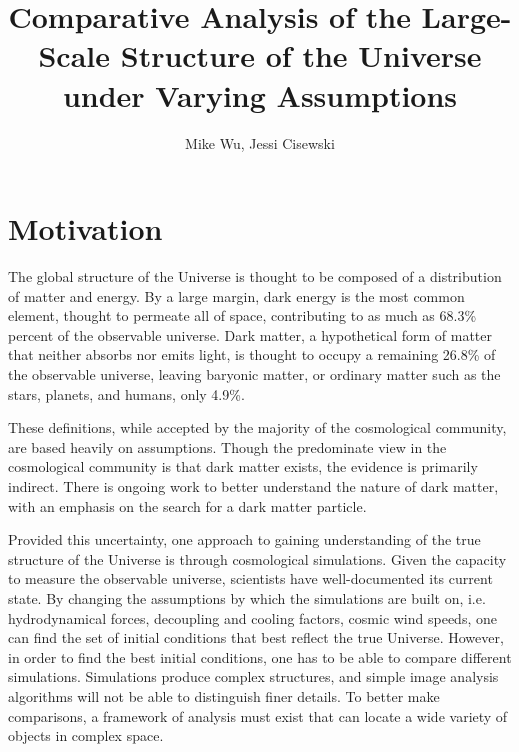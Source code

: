 \documentclass[12pt]{article}
\begin{document}
\title{Comparative Analysis of the Large-Scale Structure of the Universe under Varying Assumptions}
\author{Mike Wu, Jessi Cisewski}

\maketitle
\section{Motivation}
The global structure of the Universe is thought to be composed of a distribution of matter and energy. By a large margin, dark energy is the most common element, thought to permeate all of space, contributing to as much as 68.3\% percent of the observable universe. Dark matter, a hypothetical form of matter that neither absorbs nor emits light, is thought to occupy a remaining 26.8\% of the observable universe, leaving baryonic matter, or ordinary matter such as the stars, planets, and humans, only 4.9\%. 

These definitions, while accepted by the majority of the cosmological community, are based heavily on assumptions. Though the predominate view in the cosmological community is that dark matter exists, the evidence is primarily indirect.  There is ongoing work to better understand the nature of dark matter, with an emphasis on the search for a dark matter particle.

Provided this uncertainty, one approach to gaining understanding of the true structure of the Universe is through cosmological simulations. Given the capacity to measure the observable universe, scientists have well-documented its current state. By changing the assumptions by which the simulations are built on, i.e. hydrodynamical forces, decoupling and cooling factors, cosmic wind speeds, one can find the set of initial conditions that best reflect the true Universe. However, in order to find the best initial conditions, one has to be able to compare different simulations. Simulations produce complex structures, and simple image analysis algorithms will not be able to distinguish finer details. To better make comparisons, a framework of analysis must exist that can locate a wide variety of objects in complex space.
\end{document}
